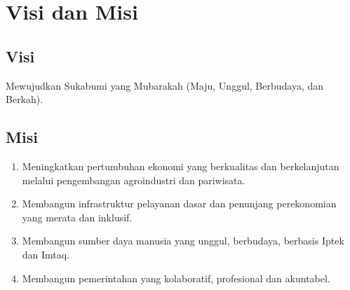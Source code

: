




\section{Visi dan Misi}

\subsection{Visi}
Mewujudkan Sukabumi yang Mubarakah (Maju, Unggul, Berbudaya, dan Berkah).

\subsection{Misi}
\begin{enumerate}
    \item Meningkatkan pertumbuhan ekonomi yang berkualitas dan berkelanjutan melalui pengembangan agroindustri dan pariwisata.

    \item Membangun infrastruktur pelayanan dasar dan penunjang perekonomian yang merata dan inklusif.

    \item Membangun sumber daya manusia yang unggul, berbudaya, berbasis Iptek dan Imtaq.

    \item Membangun pemerintahan yang kolaboratif, profesional dan akuntabel.
\end{enumerate}

